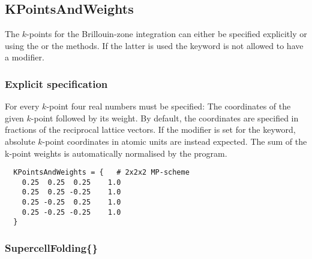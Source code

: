 \subsection{KPointsAndWeights}
\label{sec:dftbp.KPointsAndWeights}

The $k$-points for the Brillouin-zone integration can either be
specified explicitly or using the  or the
 methods. If the latter is used the
 keyword is not allowed to have a modifier.

\subsubsection{Explicit specification}

For every $k$-point four real numbers must be specified: The
coordinates of the given $k$-point followed by its weight. By default,
the coordinates are specified in fractions of the reciprocal lattice
vectors. If the modifier  is set for the
 keyword, absolute $k$-point coordinates in
atomic units are instead expected.  The sum of the k-point weights is
automatically normalised by the program.
\begin{verbatim}
  KPointsAndWeights = {   # 2x2x2 MP-scheme
    0.25  0.25  0.25    1.0
    0.25  0.25 -0.25    1.0
    0.25 -0.25  0.25    1.0
    0.25 -0.25 -0.25    1.0
  }
\end{verbatim}

\subsubsection{SupercellFolding\{\}}
\label{sec:dftbp.SupercellFolding}

